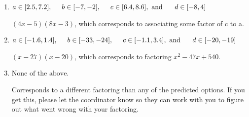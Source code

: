 \documentclass{extbook}[14pt]
\begin{document}
\begin{enumerate}
{\begin{enumerate}[label=\Alph*.]
* $(9x -5)(4x -3)$, which is the correct option.
\item \( a \in [2.5, 7.2], \hspace*{5mm} b \in [-7, -2], \hspace*{5mm} c \in [6.4, 8.6], \text{ and } \hspace*{5mm} d \in [-8, 4] \)

 $(4x -5)(8x -3)$, which corresponds to associating some factor of c to a.
\item \( a \in [-1.6, 1.4], \hspace*{5mm} b \in [-33, -24], \hspace*{5mm} c \in [-1.1, 3.4], \text{ and } \hspace*{5mm} d \in [-20, -19] \)

 $(x -27)(x -20)$, which corresponds to factoring $x^{2} -47 x + 540$.
\item \( \text{None of the above.} \)

 Corresponds to a different factoring than any of the predicted options. If you get this, please let the coordinator know so they can work with you to figure out what went wrong with your factoring.
\end{enumerate}

}
\end{enumerate}
\end{document}

